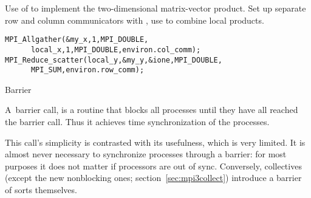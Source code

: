 Use of  to implement the two-dimensional
matrix-vector product.
Set up separate row and column communicators with
, use  to combine
local products.
%
\begin{lstlisting}
MPI_Allgather(&my_x,1,MPI_DOUBLE,
   	  local_x,1,MPI_DOUBLE,environ.col_comm);
MPI_Reduce_scatter(local_y,&my_y,&ione,MPI_DOUBLE,
	  MPI_SUM,environ.row_comm);
\end{lstlisting}

 {Barrier}
\label{sec:barrier}

A~barrier call,
%
%
is a
routine that blocks all processes until they have all reached the barrier
call. Thus it achieves time synchronization of the processes.

This call's simplicity is contrasted with its usefulness, which
is very limited. It is almost never necessary to synchronize processes
through a barrier: for most purposes it does not matter if processors
are out of sync. Conversely, collectives (except the new nonblocking
ones; section~\ref{sec:mpi3collect}) introduce a barrier of sorts themselves.

